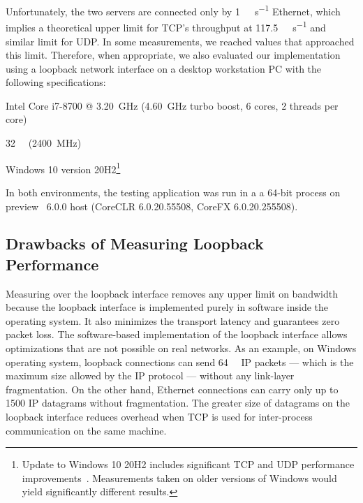 Unfortunately, the two servers are connected only by \SI[per-mode=symbol]{1}{\giga\bit\per\second}
Ethernet, which implies a theoretical upper limit for TCP's throughput at
\SI[per-mode=symbol]{117.5}{\mega\byte\per\second} and similar limit for UDP\@. In some
measurements, we reached values that approached this limit. Therefore, when appropriate, we also
evaluated our implementation using a loopback network interface on a desktop workstation PC with the
following specifications:

\begin{itemize}

         Intel\textsuperscript{\textregistered{}} Core\textsuperscript{\textregistered{}}
i7-8700 @ \SI{3.20}{\giga\hertz} (\SI{4.60}{\giga\hertz} turbo boost, 6 cores, 2 threads per core)

         \SI{32}{\giga\byte} (\SI{2400}{\mega\hertz})

         Windows 10 version 20H2\footnote{Update to Windows 10 20H2 includes significant
TCP and UDP performance improvements~\cite{theregister20h2}. Measurements taken on older versions of
Windows would yield significantly different results.}

\end{itemize}

In both environments, the testing application was run in a a 64-bit process on preview
\dotnet{}~6.0.0 host (CoreCLR 6.0.20.55508, CoreFX 6.0.20.255508).

\subsection{Drawbacks of Measuring Loopback Performance}\label{sec:04-localhost-mtu}

Measuring over the loopback interface removes any upper limit on bandwidth because the loopback
interface is implemented purely in software inside the operating system. It also minimizes the
transport latency and guarantees zero packet loss. The software-based implementation of the loopback
interface allows optimizations that are not possible on real networks. As an example, on Windows
operating system, loopback connections can send \SI{64}{\kibi\byte} IP packets --- which is the
maximum size allowed by the IP protocol --- without any link-layer fragmentation. On the other hand,
Ethernet connections can carry only up to \SI{1500}{\byte} IP datagrams without fragmentation. The
greater size of datagrams on the loopback interface reduces overhead when TCP is used for
inter-process communication on the same machine.


